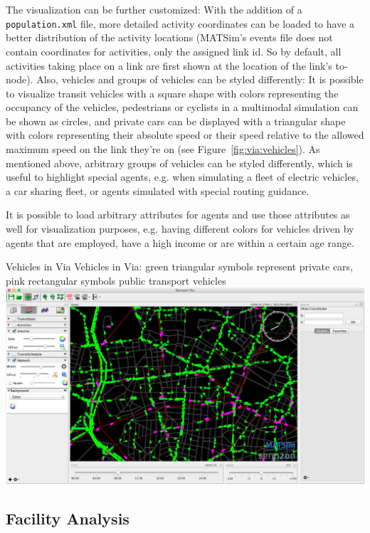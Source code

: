 The visualization can be further customized: With the addition of a {\tt
population.xml} file, more detailed activity coordinates can be loaded to have a
better distribution of the activity locations (MATSim's events file does not
contain coordinates for activities, only the assigned link id. So by default,
all activities taking place on a link are first shown at the location of
the link's to-node). Also, vehicles and groups of vehicles can be styled
differently: It is possible to visualize transit vehicles with a square shape
with colors representing the occupancy of the vehicles, pedestrians or
cyclists in a multimodal simulation can be shown as circles, and private cars
can be displayed with a triangular shape with colors representing their
absolute speed or their speed relative to the allowed maximum speed on the link
they're on (see Figure~\ref{fig:via:vehicles}). As mentioned above, arbitrary
groups of vehicles can be styled differently, which is useful to highlight
special agents, e.g. when simulating a fleet of electric vehicles, a car sharing
fleet, or agents simulated with special routing guidance.

It is possible to load arbitrary attributes for agents and use those attributes
as well for visualization purposes, e.g. having different colors for vehicles
driven by agents that are employed, have a high income or are within a certain
age range.


\createfigure%
{Vehicles in Via}%
{Vehicles in Via: green triangular symbols represent private cars, pink
rectangular symbols public transport vehicles }%
{\label{fig:via:vehicles}}%
{\includegraphics[width=1.\textwidth,angle=0]{./extending/figures/via/vehicles}}%
{}



\subsection{Facility Analysis}


